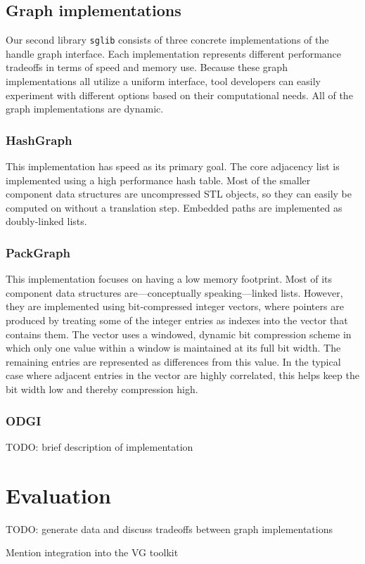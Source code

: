\documentclass{article}
\begin{document}
\subsection{Graph implementations}

Our second library \texttt{sglib} consists of three concrete implementations of the handle graph interface. Each implementation represents different performance tradeoffs in terms of speed and memory use. Because these graph implementations all utilize a uniform interface, tool developers can easily experiment with different options based on their computational needs. All of the graph implementations are dynamic.

\subsubsection{HashGraph}

This implementation has speed as its primary goal. The core adjacency list is implemented using a high performance hash table. Most of the smaller component data structures are uncompressed STL objects, so they can easily be computed on without a translation step. Embedded paths are implemented as doubly-linked lists. 

\subsubsection{PackGraph}

This implementation focuses on having a low memory footprint. Most of its component data structures are---conceptually speaking---linked lists. However, they are implemented using bit-compressed integer vectors, where pointers are produced by treating some of the integer entries as indexes into the vector that contains them. The vector uses a windowed, dynamic bit compression scheme in which only one value within a window is maintained at its full bit width. The remaining entries are represented as differences from this value. In the typical case where adjacent entries in the vector are highly correlated, this helps keep the bit width low and thereby compression high.

\subsubsection{ODGI}

TODO: brief description of implementation

\section{Evaluation}

TODO: generate data and discuss tradeoffs between graph implementations

Mention integration into the VG toolkit

\end{document}
